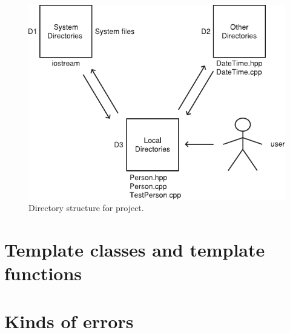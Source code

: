 \begin{figure}[ht!]
	\centering
	\includegraphics[width=0.4\paperwidth]{./../img/figure2_1}
	\caption{Directory structure for project.}
\end{figure}









\section{Template classes and template functions}







\section{Kinds of errors}



